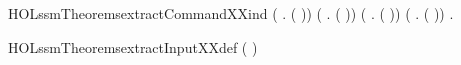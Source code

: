 \begin{SaveVerbatim}{HOLssmTheoremsextractCommandXXind}
     (\HOLSymConst{\HOLTokenForall{}} .  (  )) \HOLSymConst{\HOLTokenConj{}}
     (\HOLSymConst{\HOLTokenForall{}} .  (  )) \HOLSymConst{\HOLTokenConj{}}
     (\HOLSymConst{\HOLTokenForall{}} .  (  )) \HOLSymConst{\HOLTokenConj{}}
     (\HOLSymConst{\HOLTokenForall{}} .  (  )) \HOLSymConst{\HOLTokenImp{}}
     \HOLSymConst{\HOLTokenForall{}}.  
\end{SaveVerbatim}
\newcommand{\HOLssmTheoremsextractCommandXXind}{\UseVerbatim{HOLssmTheoremsextractCommandXXind}}
\begin{SaveVerbatim}{HOLssmTheoremsextractInputXXdef}
\HOLTokenTurnstile{}  (   ) \HOLSymConst{=} 
\end{SaveVerbatim}
\newcommand{\HOLssmTheoremsextractInputXXdef}{\UseVerbatim{HOLssmTheoremsextractInputXXdef}}
